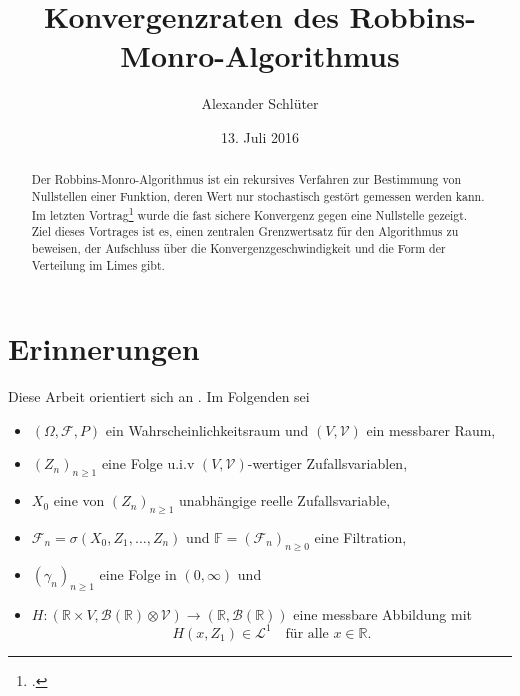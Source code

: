 \documentclass[ngerman,a4paper,11pt]{scrartcl}
\newcommand{\FF}{\mathbb{F}}
\newcommand{\RR}{\mathbb{R}}
\newcommand{\bb}{\mathcal{B}}
\newcommand{\ff}{\mathcal{F}}
\renewcommand{\ll}{\mathcal{L}}
\newcommand{\vv}{\mathcal{V}}
\newcommand{\zspace}{V}
\newcommand{\zsigma}{\vv}
\newcommand{\interv}{\RR}
\begin{document}
\title{Konvergenzraten des Robbins-Monro-Algorithmus}
\author{Alexander Schlüter}
\date{13. Juli 2016}
\maketitle
\begin{abstract}
  Der Robbins-Monro-Algorithmus ist ein rekursives Verfahren zur Bestimmung von
  Nullstellen einer Funktion, deren Wert nur stochastisch gestört gemessen
  werden kann. Im letzten Vortrag\footcite{seb} wurde die fast sichere Konvergenz gegen eine
  Nullstelle gezeigt. Ziel dieses Vortrages ist es, einen zentralen
  Grenzwertsatz für den Algorithmus zu beweisen, der Aufschluss über die
  Konvergenzgeschwindigkeit und die Form der Verteilung im Limes gibt.
\end{abstract}
\tableofcontents

\section{Erinnerungen}
Diese Arbeit orientiert sich an \cite[Kapitel 11.1]{lusch}. Im Folgenden sei    
\begin{itemize}
\item $(\Omega, \ff, P)$ ein Wahrscheinlichkeitsraum und $(\zspace,\zsigma)$ ein messbarer Raum,
\item $(Z_n)_{n\geq 1}$ eine Folge u.i.v $(\zspace, \zsigma)$-wertiger Zufallsvariablen,
\item $X_0$ eine von $(Z_n)_{n\geq 1}$ unabhängige reelle Zufallsvariable,
\item $\ff_n=\sigma(X_0,Z_1,\dotsc,Z_n)$ und $\FF=(\ff_n)_{n\geq 0}$ eine Filtration,
\item $(\gamma_n)_{n\geq 1}$ eine Folge in $(0,\infty)$ und
\item $H:(\interv\times \zspace,\bb(\interv)\otimes\zsigma)\to(\RR,\bb(\RR))$ eine messbare
  Abbildung mit
  \begin{equation*}
    H(x,Z_1)\in\ll^1\quad\text{für alle $x\in \interv$.}
  \end{equation*}
\end{itemize}
\end{document}
